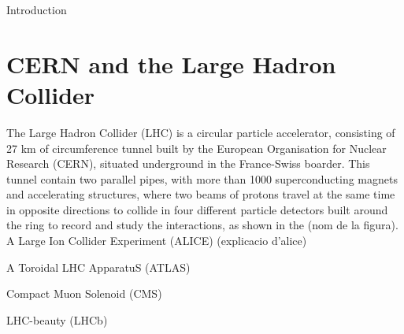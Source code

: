 Introduction


\section{CERN and the Large Hadron Collider}

The Large Hadron Collider (LHC) is a circular particle accelerator, consisting of 27 km of circumference tunnel built by the European Organisation for Nuclear Research (CERN), situated underground in the France-Swiss boarder. This tunnel contain two parallel pipes, with more than 1000 superconducting magnets and accelerating structures, where two beams of protons travel at the same time in opposite directions to collide in four different particle detectors built around the ring to record and study the interactions, as shown in the (nom de la figura).\\

A Large Ion Collider Experiment (ALICE)  (explicacio d'alice)

A Toroidal LHC ApparatuS (ATLAS)

Compact Muon Solenoid (CMS)

LHC-beauty (LHCb)

